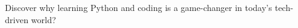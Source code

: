 \documentclass[preview]{standalone}
\begin{document}
\begin{center}
Discover why learning Python and coding is a game-changer
 in today's tech-driven world?
\end{center}
\end{document}
